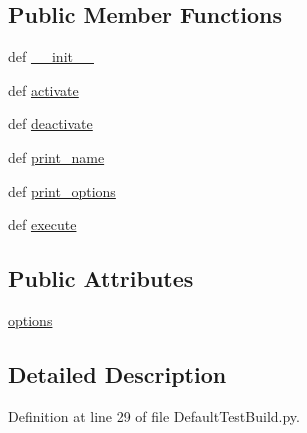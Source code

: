 \subsection*{Public Member Functions}
\begin{DoxyCompactItemize}
\item 
def \hyperlink{classDefaultTestBuild_1_1DefaultTestBuild_a08729e27591861a8c9b61a6b2618ec2f}{\-\_\-\-\_\-init\-\_\-\-\_\-}
\item 
def \hyperlink{classDefaultTestBuild_1_1DefaultTestBuild_a88b530e5d66e5dc310f77087d8744345}{activate}
\item 
def \hyperlink{classDefaultTestBuild_1_1DefaultTestBuild_a3a1fbc64d9a4750d7ecf722fb6bcd1ce}{deactivate}
\item 
def \hyperlink{classDefaultTestBuild_1_1DefaultTestBuild_a391c37a5d652ad857c57ae07b66b0d7e}{print\-\_\-name}
\item 
def \hyperlink{classDefaultTestBuild_1_1DefaultTestBuild_a38238916f0726d3a8e2b352ddc74f424}{print\-\_\-options}
\item 
def \hyperlink{classDefaultTestBuild_1_1DefaultTestBuild_a17ce5f679320871748b5aa3ea3491c28}{execute}
\end{DoxyCompactItemize}
\subsection*{Public Attributes}
\begin{DoxyCompactItemize}
\item 
\hyperlink{classDefaultTestBuild_1_1DefaultTestBuild_a2c22896be00540cc15625e79bc98c9fc}{options}
\end{DoxyCompactItemize}


\subsection{Detailed Description}


Definition at line 29 of file Default\-Test\-Build.\-py.



